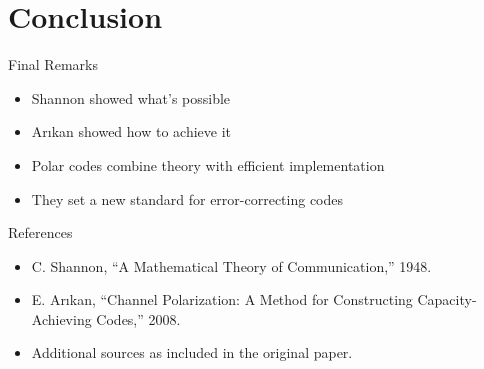 \documentclass[11pt]{beamer}
\begin{document}
\section{Conclusion}
\begin{frame}{Final Remarks}
\begin{itemize}
    \item Shannon showed what’s possible
    \item Arıkan showed how to achieve it
    \item Polar codes combine theory with efficient implementation
    \item They set a new standard for error-correcting codes
\end{itemize}
\end{frame}

\begin{frame}[allowframebreaks]{References}
\begin{itemize}
    \item C. Shannon, “A Mathematical Theory of Communication,” 1948.
    \item E. Arıkan, “Channel Polarization: A Method for Constructing Capacity-Achieving Codes,” 2008.
    \item Additional sources as included in the original paper.
\end{itemize}
\end{frame}
\end{document}
